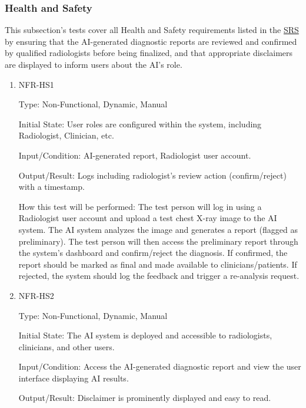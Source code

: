 \documentclass[12pt, titlepage]{article}
\begin{document}
\begin{enumerate}
\begin{enumerate}
\begin{enumerate}
\begin{enumerate}
\begin{enumerate}
\end{enumerate}

\subsubsection{Health and Safety}

This subsection's tests cover all Health and Safety requirements listed in the \href{https://github.com/RezaJodeiri/CXR-Capstone/blob/main/docs/SRS/SRS.pdf}{SRS} \citep{SRS}
 by ensuring that the AI-generated diagnostic reports are reviewed and confirmed by qualified radiologists before being finalized, and that appropriate disclaimers are displayed to inform users about the AI's role.

\begin{enumerate}

\item{NFR-HS1\\}\label{NFR-HS1}

Type: Non-Functional, Dynamic, Manual

Initial State: User roles are configured within the system, including Radiologist, Clinician, etc.

Input/Condition: AI-generated report, Radiologist user account.

Output/Result: Logs including radiologist’s review action (confirm/reject) with a timestamp.

How this test will be performed: The test person will log in using a Radiologist user account and upload a test chest X-ray image to the AI system. The AI system analyzes the image and generates a report (flagged as preliminary). The test person will then access the preliminary report through the system’s dashboard and confirm/reject the diagnosis. If confirmed, the report should be marked as final and made available to clinicians/patients. If rejected, the system should log the feedback and trigger a re-analysis request.

\item{NFR-HS2\\}\label{NFR-HS2}

Type: Non-Functional, Dynamic, Manual

Initial State: The AI system is deployed and accessible to radiologists, clinicians, and other users.

Input/Condition: Access the AI-generated diagnostic report and view the user interface displaying AI results.

Output/Result: Disclaimer is prominently displayed and easy to read.


\end{enumerate}
\end{enumerate}
\end{enumerate}
\end{enumerate}
\end{enumerate}
\end{document}
